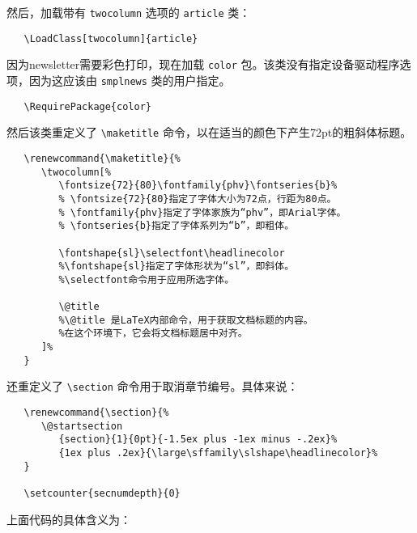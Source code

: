 \documentclass[12pt]{ltxguide}
\begin{document}
然后，加载带有 \verb|twocolumn| 选项的 \verb|article| 类：
\begin{verbatim}
   \LoadClass[twocolumn]{article}
\end{verbatim}
因为newsletter需要彩色打印，现在加载 \verb|color| 包。该类没有指定设备驱动程序选项，因为这应该由 \verb|smplnews| 类的用户指定。
\begin{verbatim}
   \RequirePackage{color}
\end{verbatim}
然后该类重定义了 \verb|\maketitle| 命令，以在适当的颜色下产生72pt的粗斜体标题。
\begin{verbatim}
   \renewcommand{\maketitle}{%
      \twocolumn[%
         \fontsize{72}{80}\fontfamily{phv}\fontseries{b}%
         % \fontsize{72}{80}指定了字体大小为72点，行距为80点。
         % \fontfamily{phv}指定了字体家族为“phv”，即Arial字体。
         % \fontseries{b}指定了字体系列为“b”，即粗体。
    
         \fontshape{sl}\selectfont\headlinecolor
         %\fontshape{sl}指定了字体形状为“sl”，即斜体。
         %\selectfont命令用于应用所选字体。
         
         \@title
         %\@title 是LaTeX内部命令，用于获取文档标题的内容。
         %在这个环境下，它会将文档标题居中对齐。
      ]%
   }
\end{verbatim}
还重定义了 \verb|\section| 命令用于取消章节编号。具体来说：
\begin{verbatim}
   \renewcommand{\section}{%
      \@startsection
         {section}{1}{0pt}{-1.5ex plus -1ex minus -.2ex}%
         {1ex plus .2ex}{\large\sffamily\slshape\headlinecolor}%
   }

   \setcounter{secnumdepth}{0}
\end{verbatim}
上面代码的具体含义为：
\end{document}

